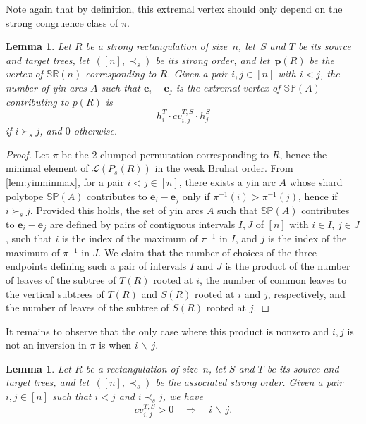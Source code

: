 \documentclass{amsart}
\newtheorem{lemma}[theorem]{Lemma}
\theoremstyle{definition}
\renewcommand{\b}[1]{{\boldsymbol{#1}}} %
\newcommand{\vincent}[1]{\todo[size=\scriptsize, color=blue!30]{\rm #1 \\ \hfill --- V.}}
\newcommand{\polytope}[1]{\mathds{#1}} %
\newcommand{\SRP}{\polytope{SR}} %
\newcommand{\SP}{\polytope{SP}}
\begin{document}
Note again that by definition, this extremal vertex should only depend on the strong congruence class of $\pi$.

\begin{lemma}
  Let $R$ be a strong rectangulation of size~$n$, let~$S$ and $T$ be its source and target trees, let~$([n],\prec_s)$ be its strong order, and let~$\b{p}(R)$ be the vertex of $\SRP(n)$ corresponding to $R$.
  Given a pair $i,j\in [n]$ with $i<j$, the number of yin arcs $A$ such that $\b{e}_i-\b{e}_j$ is the extremal vertex of $\SP(A)$ contributing to $p(R)$ is
  \[
    h^T_i \cdot cv^{T,S}_{i,j}\cdot h^S_j 
  \]
  if $i\succ_s j$, and $0$ otherwise.
\end{lemma}
\begin{proof}
  \vincent{I still need to work out this proof...}
  Let $\pi$ be the 2-clumped permutation corresponding to $R$, hence the minimal element of $\mathcal{L}(P_s(R))$ in the weak Bruhat order.
  From \cref{lem:yinminmax}, for a pair $i<j \in [n]$, there exists a yin arc $A$ whose shard polytope $\SP(A)$ contributes to $\b{e}_i-\b{e}_j$ only if
  $\pi^{-1}(i)>\pi^{-1}(j)$, hence if $i\succ_s j$.
  Provided this holds, the set of yin arcs $A$ such that $\SP(A)$ contributes to $\b{e}_i-\b{e}_j$ are defined by pairs of contiguous intervals $I,J$ of $[n]$ with $i\in I$, $j\in J$, such that $i$ is the index of the maximum of $\pi^{-1}$ in $I$, and $j$ is the index of the maximum of $\pi^{-1}$ in $J$.
  We claim that the number of choices of the three endpoints defining such a pair of intervals $I$ and $J$ is the product of the
  number of leaves of the subtree of $T(R)$ rooted at $i$, the number of common leaves to the vertical subtrees of $T(R)$ and $S(R)$ rooted
  at $i$ and $j$, respectively, and the number of leaves of the subtree of $S(R)$ rooted at $j$.
\end{proof}

It remains to observe that the only case where this product is nonzero and $i,j$ is not an inversion in $\pi$ is when $i \, \backslash \, j$.

\begin{lemma}
  Let $R$ be a rectangulation of size~$n$, let $S$ and $T$ be its source and target trees, and let~$([n],\prec_s)$ be the associated strong order.
  Given a pair $i,j\in [n]$ such that $i<j$ and $i\prec_s j$, we have
  \[
    cv^{T,S}_{i,j} > 0 \quad \Longrightarrow \quad i \, \backslash \, j.
  \]
\end{lemma}
\end{document}
